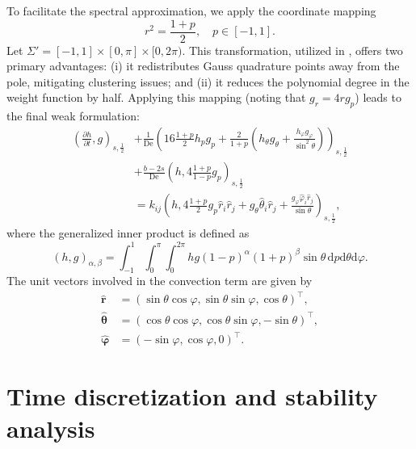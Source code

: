 \documentclass[preprint,12pt]{elsarticle}
\begin{document}
To facilitate the spectral approximation, we apply the coordinate mapping
\begin{equation}
    r^2=\frac{1+p}{2}, \quad p\in [-1,1].
\end{equation}
Let $\Sigma'=[-1,1]\times[0,\pi]\times[0,2\pi)$. This transformation, utilized in \cite{Chauviere04a,Shen12}, offers two primary advantages: (i) it redistributes Gauss quadrature points away from the pole, mitigating clustering issues; and (ii) it reduces the polynomial degree in the weight function by half. Applying this mapping (noting that $g_r=4r g_p$) leads to the final weak formulation:
\begin{equation}
    \begin{aligned}
        \left(\frac{\partial h}{\partial t},g\right)_{s,\frac{1}{2}} &+ \frac{1}{\mathrm{De}}\left(16\frac{1+p}{2}h_pg_p+\frac{2}{1+p}\left(h_{\theta}g_{\theta}+\frac{h_{\varphi}g_{\varphi}}{\sin^2\theta}\right)\right)_{s,\frac{1}{2}} \\
        &+ \frac{b-2s}{\mathrm{De}}\left(h,4\frac{1+p}{1-p}g_p\right)_{s,\frac{1}{2}} \\
        &= k_{ij}\left(h, 4\frac{1+p}{2}g_p \hat{r}_i \hat{r}_j + g_{\theta}\hat{\theta}_i \hat{r}_j + \frac{g_{\varphi}\hat{\varphi}_i \hat{r}_j}{\sin\theta}\right)_{s,\frac{1}{2}}, \label{eq:weak formulation4}
    \end{aligned}
\end{equation}
where the generalized inner product is defined as
\begin{equation}
    (h,g)_{\alpha,\beta}=\int_{-1}^1\int_0^{\pi}\int_0^{2\pi}hg(1-p)^{\alpha}(1+p)^{\beta}\sin\theta\,\mathrm{d}p\mathrm{d}\theta\mathrm{d}\varphi.
\end{equation}
The unit vectors involved in the convection term are given by
\begin{equation*}
\begin{aligned}
    \hat{\bm{r}}&=(\sin\theta \cos\varphi,\sin\theta \sin\varphi,\cos\theta)^\top,\\
    \hat{\bm{\theta}}&=(\cos\theta \cos\varphi,\cos\theta \sin\varphi,-\sin\theta)^\top,\\
    \hat{\bm{\varphi}}&=(-\sin\varphi,\cos\varphi,0)^\top.
\end{aligned}
\end{equation*}
  
\section{Time discretization and stability analysis}
\end{document}
